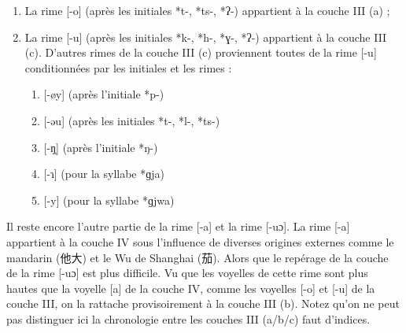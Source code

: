 \documentclass{scrbook}
\newcounter{c}[subsubsection]
\begin{document}
\begin{sloppypar}
\begin{enumerate}
\item{La rime [-o] (après les initiales *t-, *ts-, *ʔ-) appartient à la couche III (a) ;}

\item{La rime [-u] (après les initiales *k-, *h-, *ɣ-, *ʔ-) appartient à la couche III (c). D'autres rimes de la couche III (c) proviennent toutes de la rime [-u] conditionnées par les initiales et les rimes : 

\begin{enumerate}
\item{[-øy] (après l'initiale *p-)}
\item{[-əu] (après les initiales *t-, *l-, *ts-)}
\item{[-ŋ̩] (après l'initiale *ŋ-)}
\item{[-ɿ] (pour la syllabe *ɡja)}
\item{[-y] (pour la syllabe *ɡjwa)}
\end{enumerate}
}
\end{enumerate}

Il reste encore l'autre partie de la rime [-a] et la rime [-uɔ]. La rime [-a] appartient à la couche IV sous l'influence de diverses origines externes comme le mandarin (他大) et le Wu de Shanghai (茄). Alors que le repérage de la couche de la rime [-uɔ] est plus difficile. Vu que les voyelles de cette rime sont plus hautes que la voyelle [a] de la couche IV, comme les voyelles [-o] et [-u] de la couche III, on la rattache provisoirement à la couche III (b). Notez qu'on ne peut pas distinguer ici la chronologie entre les couches III (a/b/c) faut d'indices.


\end{sloppypar}
\end{document}

